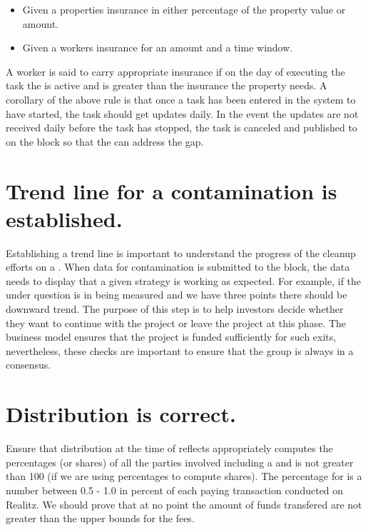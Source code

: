 \documentclass[12pt]{report}
\begin{document}
\begin{itemize}
\item  Given a properties insurance in either percentage of the property value or amount. 

\item  Given a workers insurance for an amount and a time window. 

\end{itemize}
    A worker is said to carry appropriate insurance if on the day of executing the 
    task the  is active and is greater than the insurance the property 
    needs. 
    A corollary of the above rule is that once a task has been entered in the system to have started,
    the task should get updates daily. In the event the updates are not received daily before the 
    task has stopped, the task is canceled and published to on the block so that the 
    can address the gap.


\section{Trend line for a contamination is established.}


  Establishing a trend line is important to understand the progress of the cleanup efforts
  on a . When data for contamination is submitted to the block, the data needs to 
  display that a given strategy is working as expected. For example, if the  
  under question is in being measured and we have three points there should be downward trend. 
  The purpose of this step is to help investors decide whether they want to continue with 
  the project or leave the project at this phase. The business model ensures that the project
  is funded sufficiently for such exits, nevertheless, these checks are important to ensure 
  that the group is always in a consensus.


\section{Distribution is correct.}


  Ensure that distribution at the time of  reflects appropriately computes the 
  percentages (or shares) of all the parties involved including a  and is
  not greater than 100 (if we are using percentages to compute shares).
  The percentage for  is a number between 0.5 - 1.0 in percent of 
  each paying transaction conducted on Realitz. We should prove that at no point the amount of 
  funds transfered are not greater than the upper bounds for the fees. 
\end{document}
